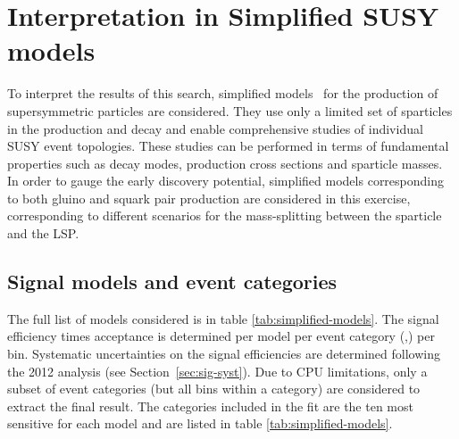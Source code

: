 \section{Interpretation in Simplified SUSY models}
\label{sec:susy}
To interpret the results of this search, simplified
models~\cite{Alwall:2008ag,Alwall:2008va,Alves:2011wf} for the production of supersymmetric particles are considered. 
They use only a limited set of sparticles in the production and
decay and enable comprehensive studies of individual SUSY event
topologies. These studies can be performed in terms of
fundamental properties such as decay modes, production cross sections and sparticle masses. 
In order to gauge the early discovery potential, simplified models corresponding to both gluino and squark pair production 
are considered in this exercise, corresponding to different scenarios for the mass-splitting between the sparticle and the LSP. 

\subsection{Signal models and event categories}
\label{subsec:susy_models}

The full list of models considered is in table \ref{tab:simplified-models}. 
The signal efficiency times acceptance is determined per model per event
category (\njet,\nb) per \HT bin. 
Systematic uncertainties on the signal efficiencies are determined 
following the 2012 analysis (see Section~\ref{sec:sig-syst}). Due to CPU
limitations, only a subset of event categories (but all \scalht bins
within a category) are considered to extract the final result. 
The categories included in the fit are the ten most sensitive 
for each model and are listed in table \ref{tab:simplified-models}. 

